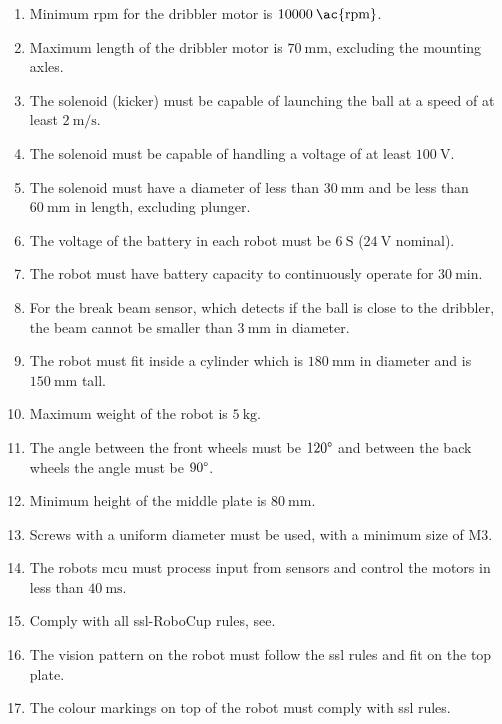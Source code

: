 \begin{enumerate}[label*=\arabic*.]
    \item Minimum \ac{rpm} for the dribbler motor is $10000\:\text{\ac{rpm}}$.
    \item Maximum length of the dribbler motor is $70\:\text{mm}$, excluding the mounting axles.
    \item The solenoid (kicker) must be capable of launching the ball at a speed of at least $2\:\text{m/s}$.
    \item The solenoid must be capable of handling a voltage of at least $100\:\text{V}$. 
    \item The solenoid must have a diameter of less than $30\:\text{mm}$ and be less than $60\:\text{mm}$ in length, excluding plunger.
    \item The voltage of the battery in each robot must be $6\:\text{S}$ ($24\:\text{V}$ nominal).
    \item The robot must have battery capacity to continuously operate for $30\:\text{min}$.
    \item For the break beam sensor, which detects if the ball is close to the dribbler, the beam cannot be smaller than $3\:\text{mm}$ in diameter.
    \item The robot must fit inside a cylinder which is $180\:\text{mm}$ in diameter and is $150\:\text{mm}$ tall.
    \item Maximum weight of the robot is $5\:\text{kg}$.
    \item The angle between the front wheels must be $120\degree$ and between the back wheels the angle must be $90\degree$.
    \item Minimum height of the middle plate is $80\:\text{mm}$.
    \item Screws with a uniform diameter must be used, with a minimum size of M3.
    \item The robots \ac{mcu} must process input from sensors and control the motors in less than $40\:\text{ms}$.
    \item Comply with all \ac{ssl}-RoboCup rules, see\:\cite{robocup_small_size_league_rules_2024}.
    \item The vision pattern on the robot must follow the \ac{ssl} rules and fit on the top plate.
    \item The colour markings on top of the robot must comply with \ac{ssl} rules.
\end{enumerate}


